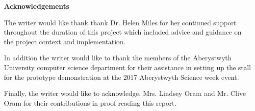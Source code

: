 \thispagestyle{empty}

\begin{center}
    {\LARGE\bf Acknowledgements}
\end{center}

The writer would like thank thank Dr. Helen Miles for her continued support throughout the duration of this project which included advice and guidance on the project context and implementation.

In addition the writer would like to thank the members of the Aberystwyth University computer science department for their assistance in setting up the stall for the prototype demonstration at the 2017 Aberystwyth Science week event.

Finally, the writer would like to acknowledge, Mrs. Lindsey Oram and Mr. Clive Oram for their contributions in proof reading this report.